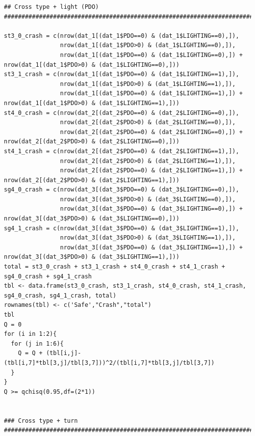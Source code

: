 \documentclass[11pt]{scrartcl} %
\begin{document}
\begin{lstlisting}
## Cross type + light (PDO)
#########################################################################################################################################################

st3_0_crash = c(nrow(dat_1[(dat_1$PDO==0) & (dat_1$LIGHTING==0),]),
                nrow(dat_1[(dat_1$PDO>0) & (dat_1$LIGHTING==0),]),
                nrow(dat_1[(dat_1$PDO==0) & (dat_1$LIGHTING==0),]) + nrow(dat_1[(dat_1$PDO>0) & (dat_1$LIGHTING==0),]))
st3_1_crash = c(nrow(dat_1[(dat_1$PDO==0) & (dat_1$LIGHTING==1),]),
                nrow(dat_1[(dat_1$PDO>0) & (dat_1$LIGHTING==1),]),
                nrow(dat_1[(dat_1$PDO==0) & (dat_1$LIGHTING==1),]) + nrow(dat_1[(dat_1$PDO>0) & (dat_1$LIGHTING==1),]))
st4_0_crash = c(nrow(dat_2[(dat_2$PDO==0) & (dat_2$LIGHTING==0),]),
                nrow(dat_2[(dat_2$PDO>0) & (dat_2$LIGHTING==0),]),
                nrow(dat_2[(dat_2$PDO==0) & (dat_2$LIGHTING==0),]) + nrow(dat_2[(dat_2$PDO>0) & (dat_2$LIGHTING==0),]))
st4_1_crash = c(nrow(dat_2[(dat_2$PDO==0) & (dat_2$LIGHTING==1),]),
                nrow(dat_2[(dat_2$PDO>0) & (dat_2$LIGHTING==1),]),
                nrow(dat_2[(dat_2$PDO==0) & (dat_2$LIGHTING==1),]) + nrow(dat_2[(dat_2$PDO>0) & (dat_2$LIGHTING==1),]))
sg4_0_crash = c(nrow(dat_3[(dat_3$PDO==0) & (dat_3$LIGHTING==0),]),
                nrow(dat_3[(dat_3$PDO>0) & (dat_3$LIGHTING==0),]),
                nrow(dat_3[(dat_3$PDO==0) & (dat_3$LIGHTING==0),]) + nrow(dat_3[(dat_3$PDO>0) & (dat_3$LIGHTING==0),]))
sg4_1_crash = c(nrow(dat_3[(dat_3$PDO==0) & (dat_3$LIGHTING==1),]),
                nrow(dat_3[(dat_3$PDO>0) & (dat_3$LIGHTING==1),]),
                nrow(dat_3[(dat_3$PDO==0) & (dat_3$LIGHTING==1),]) + nrow(dat_3[(dat_3$PDO>0) & (dat_3$LIGHTING==1),]))
total = st3_0_crash + st3_1_crash + st4_0_crash + st4_1_crash + sg4_0_crash + sg4_1_crash
tbl <- data.frame(st3_0_crash, st3_1_crash, st4_0_crash, st4_1_crash, sg4_0_crash, sg4_1_crash, total)
rownames(tbl) <- c('Safe',"Crash","total")
tbl
Q = 0
for (i in 1:2){
  for (j in 1:6){
    Q = Q + (tbl[i,j]-(tbl[i,7]*tbl[3,j]/tbl[3,7]))^2/(tbl[i,7]*tbl[3,j]/tbl[3,7])
  }
}
Q >= qchisq(0.95,df=(2*1))


### Cross type + turn
#######################################################################################################################


\end{lstlisting}
\end{document}
